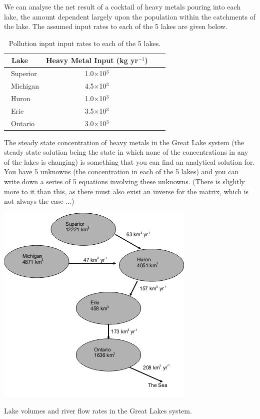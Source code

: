 \documentclass{tufte-book} %
\begin{document}
We can analyse the net result of a cocktail of heavy metals pouring into each lake, the amount dependent largely upon the population within the catchments of the lake. The assumed input rates to each of the 5 lakes are given below.

\begin{table}[h]
\footnotesize%
\begin{center}
\begin{tabular}{lccl}
\toprule
\ Lake & Heavy Metal Input (kg yr\(^{-1}\)) \\
\midrule
\ Superior & 1.0\(\times\)10\(^{3}\) \\
\ Michigan & 4.5\(\times\)10\(^{3}\) \\
\ Huron & 1.0\(\times\)10\(^{3}\) \\
\ Erie & 3.5\(\times\)10\(^{3}\) \\
\ Ontario & 3.0\(\times\)10\(^{3}\) \\
\bottomrule
\end{tabular}
\end{center}
\caption{Pollution input input rates to each of the 5 lakes.}
\label{tab:ch4-laketable}
\end{table}

The steady state concentration of heavy metals in the Great Lake system (the steady state solution being the state in which none of the concentrations in any of the lakes is changing) is something that you can find an analytical solution for. You have 5 unknowns (the concentration in each of the 5 lakes) and you can write down a series of 5 equations involving these unknowns. (There is slightly more to it than this, as there must also exist an inverse for the matrix, which is not always the case ...)

\begin{marginfigure}[0.0in]
\includegraphics[width=\linewidth]{ch4-lakes_schematic.tif}
\caption{Lake volumes and river flow rates in the Great Lakes system.}
\label{fig:ch4-lakes_schematic}
\end{marginfigure}
\end{document}
